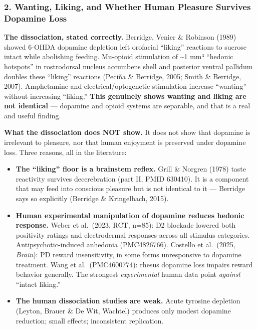 \subsubsection{2. Wanting, Liking, and Whether Human Pleasure Survives Dopamine Loss}\label{02_dopamine_action-wanting-liking-and-whether-human-pleasure-survives-dopamine-loss}

\textbf{The dissociation, stated correctly.} Berridge, Venier \& Robinson (1989) showed 6-OHDA dopamine depletion left orofacial ``liking'' reactions to sucrose intact while abolishing feeding. Mu-opioid stimulation of \textasciitilde1 mm³ ``hedonic hotspots'' in rostrodorsal nucleus accumbens shell and posterior ventral pallidum doubles these ``liking'' reactions (Peciña \& Berridge, 2005; Smith \& Berridge, 2007). Amphetamine and electrical/optogenetic stimulation increase ``wanting'' without increasing ``liking.'' \textbf{This genuinely shows wanting and liking are not identical} --- dopamine and opioid systems are separable, and that is a real and useful finding.

\textbf{What the dissociation does NOT show.} It does not show that dopamine is irrelevant to pleasure, nor that human enjoyment is preserved under dopamine loss. Three reasons, all in the literature:

\begin{itemize}
\tightlist
\item
  \textbf{The ``liking'' floor is a brainstem reflex.} Grill \& Norgren (1978) taste reactivity survives decerebration (part II, PMID 630410). It is a component that may feed into conscious pleasure but is not identical to it --- Berridge says so explicitly (Berridge \& Kringelbach, 2015).
\item
  \textbf{Human experimental manipulation of dopamine reduces hedonic response.} Weber et al.~(2023, RCT, n=85): D2 blockade lowered both positivity ratings and electrodermal responses across all stimulus categories. Antipsychotic-induced anhedonia (PMC4826766). Costello et al.~(2025, \emph{Brain}): PD reward insensitivity, in some forms unresponsive to dopamine treatment. Wang et al.~(PMC4600774): rhesus dopamine loss impairs reward behavior generally. The strongest \emph{experimental} human data point \emph{against} ``intact liking.''
\item
  \textbf{The human dissociation studies are weak.} Acute tyrosine depletion (Leyton, Brauer \& De Wit, Wachtel) produces only modest dopamine reduction; small effects; inconsistent replication.
\end{itemize}

